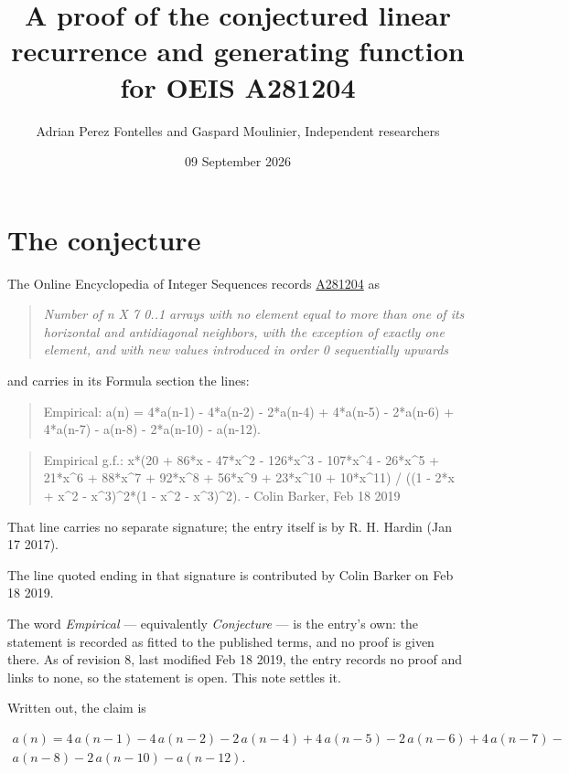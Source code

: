 \documentclass[11pt]{article}
\title{A proof of the conjectured linear recurrence and generating function for OEIS A281204}
\author{Adrian Perez Fontelles and Gaspard Moulinier, Independent researchers}
\date{09 September 2026}
\theoremstyle{definition}
\begin{document}
\maketitle
\section{The conjecture}

The Online Encyclopedia of Integer Sequences records \href{https://oeis.org/A281204}{A281204} as

\begin{quote}\itshape Number of n X 7 0..1 arrays with no element equal to more than one of its horizontal and antidiagonal neighbors, with the exception of exactly one element, and with new values introduced in order 0 sequentially upwards\end{quote}

and carries in its Formula section the lines:

\begin{quote}\ttfamily Empirical: a(n) = 4*a(n-1) - 4*a(n-2) - 2*a(n-4) + 4*a(n-5) - 2*a(n-6) + 4*a(n-7) - a(n-8) - 2*a(n-10) - a(n-12).\end{quote}

\begin{quote}\ttfamily Empirical g.f.: x*(20 + 86*x - 47*x\textasciicircum{}2 - 126*x\textasciicircum{}3 - 107*x\textasciicircum{}4 - 26*x\textasciicircum{}5 + 21*x\textasciicircum{}6 + 88*x\textasciicircum{}7 + 92*x\textasciicircum{}8 + 56*x\textasciicircum{}9 + 23*x\textasciicircum{}10 + 10*x\textasciicircum{}11) / ((1 - 2*x + x\textasciicircum{}2 - x\textasciicircum{}3)\textasciicircum{}2*(1 - x\textasciicircum{}2 - x\textasciicircum{}3)\textasciicircum{}2). - Colin Barker, Feb 18 2019\end{quote}

That line carries no separate signature; the entry itself is by R. H. Hardin (Jan 17 2017).

The line quoted ending in that signature is contributed by Colin Barker on Feb 18 2019.

The word {\itshape Empirical} --- equivalently {\itshape Conjecture} --- is the entry's own: the statement is recorded as fitted to the published terms, and no proof is given there. As of revision 8, last modified Feb 18 2019, the entry records no proof and links to none, so the statement is open. This note settles it.

Written out, the claim is

\begin{multline*} a(n) = 4\,a(n-1) - 4\,a(n-2) - 2\,a(n-4) + 4\,a(n-5) - 2\,a(n-6) + 4\,a(n-7) - \\ a(n-8) - 2\,a(n-10) - a(n-12). \end{multline*}
\end{document}
